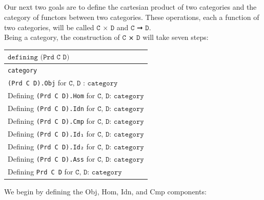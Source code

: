 \documentclass{book}
\newcounter{sectioncount}
\newcounter{subsectioncount}
\renewcommand{\section}[1]{\newpage
\ \\
\ \\
 \begin{center} \scalebox{1.5}{\texttt{\thesectioncount . #1}} \setcounter{sectioncount}{\thesectioncount+1} \setcounter{subsectioncount}{1} \end{center}
 \begin{center}

\ \\
\ \\

\thispagestyle{empty}
\end{center}
}
\begin{document}
\section{\texttt{D ⨯_Cat C}}

Our next two goals are to define the cartesian product of two categories and the category of functors between two categories. These operations, each a function of two categories, will be called $\texttt{C × D}$ and $\texttt{C ➞ D}$.\\

Being a category, the construction of $\texttt{C ⨯ D}$ will take seven steps:

{
\small
\begin{center}
\begin{tabular}{|l |} 
 \hline
 $\texttt{defining (Prd C D)}$\\
 \hline \hline
 \texttt{category} \\ 
 \hline
 \texttt{(Prd C D).Obj} for $\texttt{C, D : category}$\\
 \hline
 Defining  \texttt{(Prd C D).Hom} for $\texttt{C, D: category}$\\
 \hline
 Defining  \texttt{(Prd C D).Idn} for $\texttt{C, D: category}$\\
 \hline
 Defining  \texttt{(Prd C D).Cmp} for $\texttt{C, D: category}$\\
 \hline
 Defining  \texttt{(Prd C D).Id₁} for $\texttt{C, D: category}$\\
 \hline
 Defining \texttt{(Prd C D).Id₂} for $\texttt{C, D: category}$\\
 \hline
 Defining \texttt{(Prd C D).Ass} for $\texttt{C, D: category}$\\
 \hline
 Defining \texttt{Prd C D} for $\texttt{C, D: category}$\\
 \hline
\end{tabular}
\end{center}
}

We begin by defining the Obj, Hom, Idn, and Cmp components:
\end{document}
